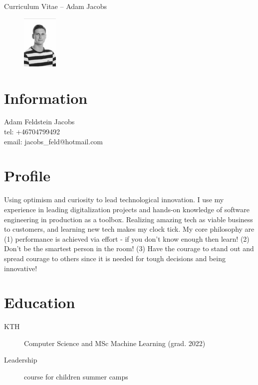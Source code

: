 \documentclass[margin,line,a4paper]{resume}
\begin{document}
{\sc \Large Curriculum Vitae -- Adam Jacobs}
\begin{resume}
    \vspace{0.01cm}
    \begin{figure}
        \vspace{-1cm}
       \begin{center}
       \includegraphics[width=0.15\textwidth]{adamjacobs}
       \end{center}
        \vspace{-1cm}
    \end{figure}
    
    \section{\mysidestyle Information}%
    Adam Feldstein Jacobs \\
    tel: +46704799492 \\
    email: jacobs\_feld@hotmail.com
    \href{} \\

\section{\mysidestyle Profile}\vspace{1mm}
Using optimism and curiosity to lead technological innovation. I use my experience in leading digitalization projects and hands-on knowledge of software engineering in production as a toolbox. Realizing amazing tech as viable business to customers, and learning new tech makes my clock tick. My core philosophy are (1) performance is achieved via effort - if you don't know enough then learn! (2) Don't be the smartest person in the room! (3) Have the courage to stand out and spread courage to others since it is needed for tough decisions and being innovative! 

\section{\mysidestyle Education}\vspace{1mm}
    \begin{description}
        \item[KTH] Computer Science and MSc Machine Learning (grad. 2022)
         \item[Leadership] course for children summer camps
    \end{description} 


\end{resume}
\end{document}
